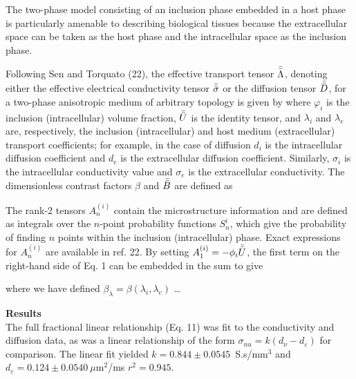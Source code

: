 {The two-phase model consisting of an inclusion phase embedded in a host phase is particularly amenable to describing biological tissues because the extracellular space can be taken as the host phase and the intracellular space as the inclusion phase.
 
Following Sen and Torquato (22), the effective transport tensor $\Bar{\bar{\Lambda}}$, denoting either the effective electrical conductivity tensor $\Bar{\bar{\sigma}}$ or the diffusion tensor $\Bar{\bar{D}}$, for a two-phase anisotropic medium of arbitrary topology is given by
where $\varphi_{i}$ is the inclusion (intracellular) volume fraction, $\Bar{\bar{U}}$ is the identity tensor, and $\lambda_{i}$ and $\lambda_{e}$ are, respectively, the inclusion (intracellular) and host medium (extracellular) transport coefficients; for example, in the case of diffusion $d_{i}$ is the intracellular diffusion coefficient and $d_{e}$ is the extracellular diffusion coefficient. Similarly, $\sigma_{i}$ is the intracellular conductivity value and $\sigma_{e}$ is the extracellular conductivity. The dimensionless contrast factors $\beta$ and $\Bar{\bar{B}}$ are defined as


The rank-2 tensors $A_{n}^{(i)}$ contain the microstructure information and are defined as integrals over the $n$-point probability functions $S_{n}^{i}$, which give the probability of finding $n$ points within the inclusion (intracellular) phase. Exact expressions for $A_{n}^{(i)}$ are available in ref. 22.
By setting $A_{1}^{(i)} = - \phi_{i} \Bar{\bar{U}}$, the first term on the right-hand side of Eq. 1 can be embedded in the sum to give 


where we have defined $\beta_{\lambda} = \beta(\lambda_{i}, \lambda_{e})$ \dots

{\bf Results} \\
The full fractional linear relationship (Eq. 11) was fit to the conductivity and diffusion data, as was a linear relationship of the form $\sigma_{nu} = k(d_{\nu} - d_{\varepsilon})$ for comparison. The linear fit yielded $k = 0.844 \pm 0.0545$~S.s/mm$^{3}$ and $d_{\varepsilon} = 0.124 \pm 0.0540~\mu$m$^{2}$/ms $r^{2} = 0.945$.
}
